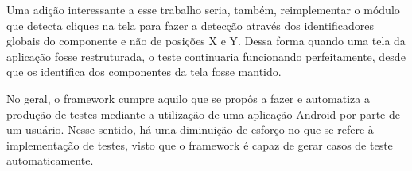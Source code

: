 \documentclass[
    12pt,       %
    openright,      %
    twoside,      %
    a4paper,      %
    english,      %
    french,       %
    spanish,      %
    brazil,       %
    ]{abntex2}
\begin{document}
      Uma adição interessante a esse trabalho seria, também, reimplementar o módulo que detecta cliques na tela
      para fazer a detecção através dos identificadores globais do componente e não de posições X e Y. Dessa forma
      quando uma tela da aplicação fosse restruturada, o teste continuaria funcionando perfeitamente, desde que
      os identifica dos componentes da tela fosse mantido.

      No geral, o framework cumpre aquilo que se propôs a fazer e automatiza a produção de testes
      mediante a utilização de uma aplicação Android por parte de um usuário. Nesse sentido, há uma diminuição
      de esforço no que se refere à implementação de testes, visto que o framework é capaz de gerar casos de teste
      automaticamente.











  \postextual


  
\end{document}
